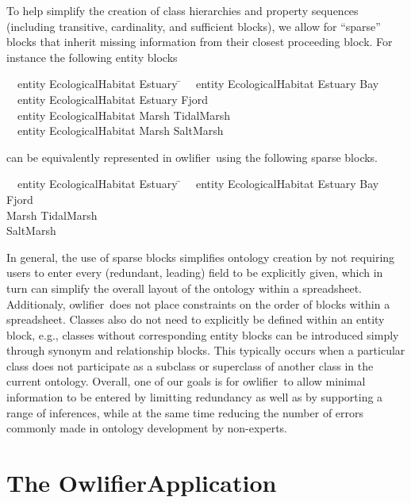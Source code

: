 \documentclass[preprint,number]{elsarticle}
\newcommand{\Owlifier}{\textsf{Owlifier}}
\newcommand{\owlifier}{\textsf{owlifier}}
\begin{document}
To help simplify the creation of class hierarchies and property
sequences (including transitive, cardinality, and sufficient blocks),
we allow for ``sparse'' blocks that inherit missing information from
their closest proceeding block. For instance the following entity
blocks
\begin{tabbing}
  ~~\textsf{entity} \= \textsf{EcologicalHabitat} \= \textsf{Estuary} \= \kill
  ~~\textsf{entity} \> \textsf{EcologicalHabitat} \> \textsf{Estuary} \> 
  \textsf{Bay}\\
  ~~\textsf{entity} \> \textsf{EcologicalHabitat} \> \textsf{Estuary} \>
  \textsf{Fjord} \\
  ~~\textsf{entity} \> \textsf{EcologicalHabitat} \> \textsf{Marsh} \>
  \textsf{TidalMarsh} \\ 
  ~~\textsf{entity} \> \textsf{EcologicalHabitat} \> \textsf{Marsh} \>
  \textsf{SaltMarsh}
\end{tabbing}
can be equivalently represented in \owlifier\ using the following
sparse blocks.
\begin{tabbing}
  ~~\textsf{entity} \= \textsf{EcologicalHabitat} \= \textsf{Estuary} \= \kill
  ~~\textsf{entity} \> \textsf{EcologicalHabitat} \> \textsf{Estuary} \> 
  \textsf{Bay}\\
  \> \> \> \textsf{Fjord} \\
  \> \> \textsf{Marsh} \> \textsf{TidalMarsh} \\ 
  \> \> \> \textsf{SaltMarsh}
\end{tabbing}
In general, the use of sparse blocks simplifies ontology creation by
not requiring users to enter every (redundant, leading) field to be
explicitly given, which in turn can simplify the overall layout of the
ontology within a spreadsheet.  Additionaly, \owlifier\ does not place
constraints on the order of blocks within a spreadsheet. Classes also
do not need to explicitly be defined within an entity block, e.g.,
classes without corresponding entity blocks can be introduced simply
through synonym and relationship blocks. This typically occurs when a
particular class does not participate as a subclass or superclass of
another class in the current ontology. Overall, one of our goals is
for \owlifier\ to allow minimal information to be entered by limitting
redundancy as well as by supporting a range of inferences, while at
the same time reducing the number of errors commonly made in ontology
development by non-experts.

\section{The \Owlifier Application}
\label{sec:implementation}
\end{document}
